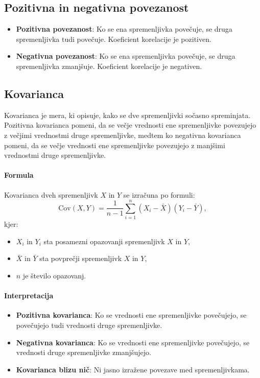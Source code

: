 \subsection*{Pozitivna in negativna povezanost}
\begin{itemize}
    \item \textbf{Pozitivna povezanost}: Ko se ena spremenljivka povečuje, se druga spremenljivka tudi povečuje. Koeficient korelacije je pozitiven.
    \item \textbf{Negativna povezanost}: Ko se ena spremenljivka povečuje, se druga spremenljivka zmanjšuje. Koeficient korelacije je negativen.
\end{itemize}

\subsection{Kovarianca}

Kovarianca je mera, ki opisuje, kako se dve spremenljivki sočasno spreminjata. Pozitivna kovarianca pomeni, da se večje vrednosti ene spremenljivke povezujejo z večjimi vrednostmi druge spremenljivke, medtem ko negativna kovarianca pomeni, da se večje vrednosti ene spremenljivke povezujejo z manjšimi vrednostmi druge spremenljivke.

\paragraph{Formula}
Kovarianca dveh spremenljivk $X$ in $Y$ se izračuna po formuli:
\[\text{Cov}(X, Y) = \frac{1}{n-1} \sum_{i=1}^n (X_i - \bar{X})(Y_i - \bar{Y}),\]
kjer:
\begin{itemize}
    \item $X_i$ in $Y_i$ sta posamezni opazovanji spremenljivk $X$ in $Y$,
    \item $\bar{X}$ in $\bar{Y}$ sta povprečji spremenljivk $X$ in $Y$,
    \item $n$ je število opazovanj.
\end{itemize}

\paragraph{Interpretacija}
\begin{itemize}
    \item \textbf{Pozitivna kovarianca}: Ko se vrednosti ene spremenljivke povečujejo, se povečujejo tudi vrednosti druge spremenljivke.
    \item \textbf{Negativna kovarianca}: Ko se vrednosti ene spremenljivke povečujejo, se vrednosti druge spremenljivke zmanjšujejo.
    \item \textbf{Kovarianca blizu nič}: Ni jasno izražene povezave med spremenljivkama.
\end{itemize}


